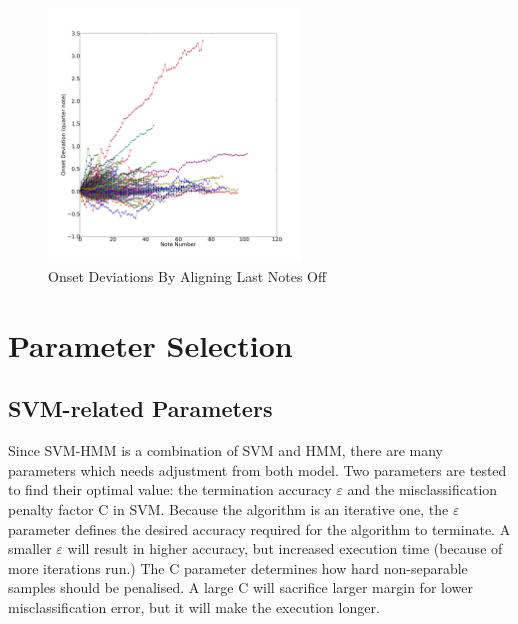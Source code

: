 \begin{figure}[tp]
   \begin{center}
      \includegraphics[width=0.6\textwidth]{fig/lian_onset_4}
   \end{center}
   \caption{Onset Deviations By Aligning Last Notes Off}
   \label{fig:norm3}
\end{figure}



\section{Parameter Selection}
\label{sec:paramselect}
\subsection{SVM-related Parameters}
Since SVM-HMM is a combination of SVM and HMM, there are many parameters which needs adjustment from both model. Two parameters are tested to find their optimal value: the termination accuracy $\varepsilon$ and the misclassification penalty factor C in SVM. Because the algorithm is an iterative one, the $\varepsilon$ parameter defines the desired accuracy required for the algorithm to terminate. A smaller $\varepsilon$ will result in higher accuracy, but increased execution time (because of more iterations run.) The C parameter determines how hard non-separable samples should be penalised. A large C will sacrifice larger margin for lower misclassification error, but it will make the execution longer.%

